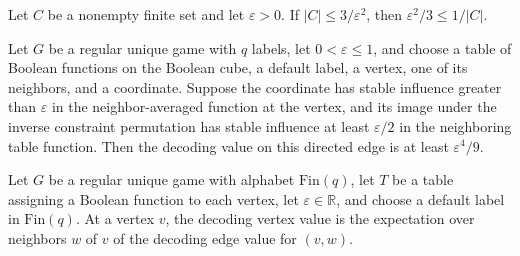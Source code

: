 \begin{theorem}
\label{FABL.RegularUniqueGame.epsilon_sq_div_three_le_inv_card}
\leanok
{}
Let $C$ be a nonempty finite set and let $\varepsilon>0$. If $|C|\leq3/\varepsilon^2$, then $\varepsilon^2/3\leq1/|C|$.
\end{theorem}

\begin{theorem}
\label{FABL.RegularUniqueGame.epsilon_pow_four_div_nine_le_decodingEdgeValue}
\leanok
{}
Let $G$ be a regular unique game with $q$ labels, let $0<\varepsilon\le 1$, and choose a
table of Boolean functions on the Boolean cube, a default label, a vertex, one of its
neighbors, and a coordinate. Suppose the coordinate has stable influence greater than
$\varepsilon$ in the neighbor-averaged function at the vertex, and its image under the
inverse constraint permutation has stable influence at least $\varepsilon/2$ in the
neighboring table function. Then the decoding value on this directed edge is at least
$\varepsilon^4/9$.
\end{theorem}

\begin{definition}
\label{FABL.RegularUniqueGame.decodingVertexValue}
\leanok
{}
Let $G$ be a regular unique game with alphabet $\text{Fin}(q)$, let $T$ be a table
assigning a Boolean function to each vertex, let $\varepsilon\in\mathbb R$, and choose a
default label in $\text{Fin}(q)$. At a vertex $v$, the decoding vertex value is the
expectation over neighbors $w$ of $v$ of the decoding edge value for $(v,w)$.
\end{definition}

